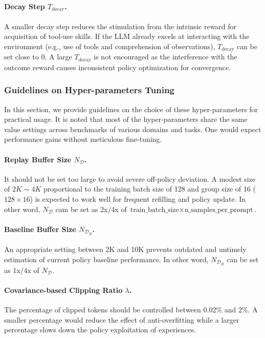 \documentclass[]{youtu} %
\begin{document}
\paragraph{Decay Step $T_{\text{decay}}$.}
A smaller decay step reduces the stimulation from the intrinsic reward for acquisition of tool-use skills.
If the LLM already excels at interacting with the environment (e.g., use of tools and comprehension of observations),
$T_{\text{decay}}$ can be set close to 0.
A large $T_{\text{decay}}$ is not encouraged as the interference with the outcome reward causes inconsistent policy optimization for convergence. 



{
\subsubsection{Guidelines on Hyper-parameters Tuning}
In this section, we provide guidelines on the choice of these hyper-parameters for practical usage. It is noted that most of the hyper-parameters share the same value settings across benchmarks of various domains and tasks.
One would expect performance gains without meticulous fine-tuning.


\paragraph{Replay Buffer Size $N_{\mathcal{D}}$.}
It should not be set too large to avoid severe off-policy deviation. A modest size of $2K\sim 4K$ proportional to the training batch size of 128 and group size of 16 ($128\times16$) is expected to work well for frequent refilling and policy update.
In other word, $N_{\mathcal{D}}$ cam be set as 2x/4x of $\text{train\_batch\_size}\times\text{n\_samples\_per\_prompt}$.


\paragraph{Baseline Buffer Size $N_{\mathcal{D}_R}$.}
An appropriate setting between 2K and 10K prevents outdated and untimely estimation of current policy baseline performance.
In other word, $N_{\mathcal{D}_{R}}$ can be set as 1x/4x of $N_{\mathcal{D}}$.



\paragraph{Covariance-based Clipping Ratio $\lambda$.}
The percentage of clipped tokens should be controlled between 0.02\% and 2\%. A smaller percentage would reduce the effect of anti-overfitting while a larger percentage slows down the policy exploitation of experiences.


}
\end{document}
